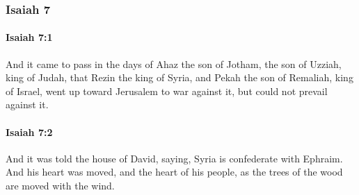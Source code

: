 	\subsubsection{Isaiah 7} %
		\label{ISAIAH-7}

		\paragraph{Isaiah 7:1} %
			\label{ISAIAH-7-1}

			And it came to pass in the days of Ahaz the son of Jotham, the son of Uzziah, king of Judah, that Rezin the king of Syria, and Pekah the son of Remaliah, king of Israel, went up toward Jerusalem to war against it, but could not prevail against it.


		\paragraph{Isaiah 7:2} %
			\label{ISAIAH-7-2}

			And it was told the house of David, saying, Syria is confederate with Ephraim. And his heart was moved, and the heart of his people, as the trees of the wood are moved with the wind.

